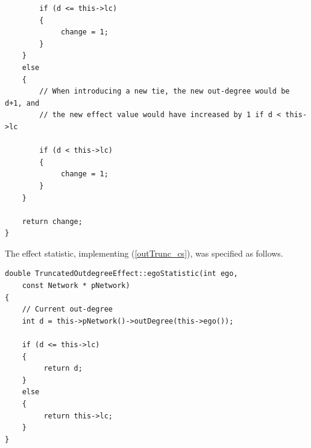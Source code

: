 \documentclass[a4paper,fleqn,11pt]{article}
\newcommand{\+}{\, + \,}
\begin{document}
{\begin{enumerate}
{\begin{verbatim}
        if (d <= this->lc)
        {
             change = 1;
        }
    }
    else
    {
        // When introducing a new tie, the new out-degree would be d+1, and
        // the new effect value would have increased by 1 if d < this->lc

        if (d < this->lc)
        {
             change = 1;
        }
    }

    return change;
}
\end{verbatim}
}

      The effect statistic, implementing (\ref{outTrunc_cs}),
      was specified as follows.

{\small
\begin{verbatim}
double TruncatedOutdegreeEffect::egoStatistic(int ego,
    const Network * pNetwork)
{
    // Current out-degree
    int d =	this->pNetwork()->outDegree(this->ego());

    if (d <= this->lc)
    {
         return d;
    }
    else
    {
         return this->lc;
    }
}
\end{verbatim}
}


\end{enumerate}}
\end{document}
